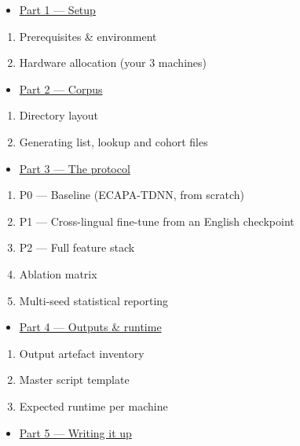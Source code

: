 \documentclass[10pt,a4paper]{article}
\begin{document}
\begin{itemize}[leftmargin=*,itemsep=2pt]
  \item \href{\#part-1--setup}{Part 1 --- Setup}
\end{itemize}
\begin{enumerate}[leftmargin=*,itemsep=2pt]
  \item Prerequisites \& environment
  \item Hardware allocation (your 3 machines)
\end{enumerate}
\begin{itemize}[leftmargin=*,itemsep=2pt]
  \item \href{\#part-2--corpus}{Part 2 --- Corpus}
\end{itemize}
\begin{enumerate}[leftmargin=*,itemsep=2pt]
  \item Directory layout
  \item Generating list, lookup and cohort files
\end{enumerate}
\begin{itemize}[leftmargin=*,itemsep=2pt]
  \item \href{\#part-3--the-protocol}{Part 3 --- The protocol}
\end{itemize}
\begin{enumerate}[leftmargin=*,itemsep=2pt]
  \item P0 --- Baseline (ECAPA-TDNN, from scratch)
  \item P1 --- Cross-lingual fine-tune from an English checkpoint
  \item P2 --- Full feature stack
  \item Ablation matrix
  \item Multi-seed statistical reporting
\end{enumerate}
\begin{itemize}[leftmargin=*,itemsep=2pt]
  \item \href{\#part-4--outputs--runtime}{Part 4 --- Outputs \& runtime}
\end{itemize}
\begin{enumerate}[leftmargin=*,itemsep=2pt]
  \item Output artefact inventory
  \item Master script template
  \item Expected runtime per machine
\end{enumerate}
\begin{itemize}[leftmargin=*,itemsep=2pt]
  \item \href{\#part-5--writing-it-up}{Part 5 --- Writing it up}
\end{itemize}
\end{document}
